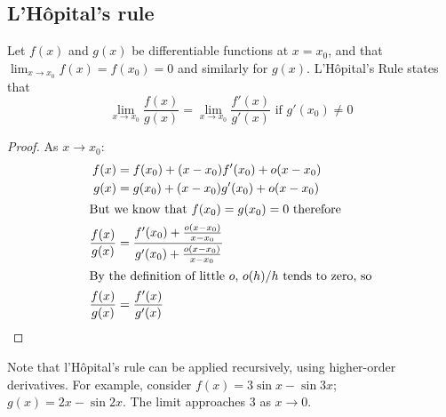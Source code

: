 \subsection{L'H\^opital's rule}
Let \(f(x)\) and \(g(x)\) be differentiable functions at \(x=x_0\), and that \(\lim_{x\to x_0} f(x) = f(x_0) = 0\) and similarly for \(g(x)\).
L'H\^opital's Rule states that
\[
	\lim_{x\to x_0} \frac{f(x)}{g(x)} = \lim_{x\to x_0} \frac{f'(x)}{g'(x)} \text{ if } g'(x_0) \neq 0
\]
\begin{proof}
	As \(x \to x_0\):
	\begin{align*}
		f(x)              & = f(x_0) + (x-x_0) f'(x_0) + o(x-x_0)                                       \\
		g(x)              & = g(x_0) + (x-x_0) g'(x_0) + o(x-x_0)                                       \\
		\intertext{But we know that \(f(x_0)=g(x_0)=0\) therefore}
		\frac{f(x)}{g(x)} & = \frac{f'(x_0) + \frac{o(x-x_0)}{x-x_0}}{g'(x_0) + \frac{o(x-x_0)}{x-x_0}} \\
		\intertext{By the definition of little \(o\), \(o(h)/h\) tends to zero, so}
		\frac{f(x)}{g(x)} & = \frac{f'(x)}{g'(x)}
	\end{align*}
\end{proof}
Note that l'H\^opital's rule can be applied recursively, using higher-order derivatives.
For example, consider \(f(x) = 3\sin x - \sin 3x\); \(g(x) = 2x - \sin 2x\).
The limit approaches 3 as \(x \to 0\).
